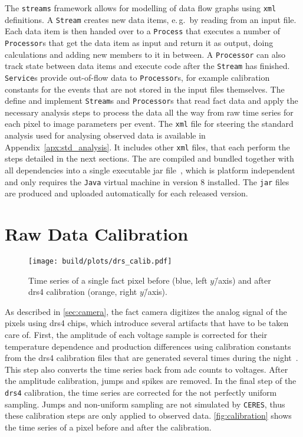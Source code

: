 The \texttt{streams} framework allows for modelling of data flow graphs using \texttt{xml}
definitions.
A \texttt{Stream} creates new data items, e.\,g.\ by reading from an input file.
Each data item is then handed over to a \texttt{Process} that executes a number of
\texttt{Processor}s that get the data item as input and return it as output, doing
calculations and adding new members to it in between.
A \texttt{Processor} can also track state between data items and execute code
after the \texttt{Stream} has finished.
\texttt{Service}s provide out-of-flow data to \texttt{Processor}s, for example
calibration constants for the events that are not stored in the input files themselves.
The \facttools{} define and implement \texttt{Stream}s and \texttt{Processor}s that read \gls{fact} data
and apply the necessary analysis steps to process the data all the way from 
raw time series for each pixel to image parameters per event.
The \texttt{xml} file for steering the \facttools{} standard analysis used for
analysing observed data is available in Appendix~\ref{apx:std_analysis}.
It includes other \texttt{xml} files, that each perform the steps detailed in the next 
sections.
The \facttools{} are compiled and bundled together with all dependencies
into a single executable jar file~\cite{jar}, which is platform independent and only
requires the \texttt{Java} virtual machine in version 8 installed.
The \texttt{jar} files are produced and uploaded automatically for each released version.


\section{Raw Data Calibration}\label{sec:calibration}
\begin{figure}
  \centering
  \texttt{[image: build/plots/drs\_calib.pdf]}
  \caption{%
    Time series of a single \gls{fact} pixel before (blue, left $y$\=/axis) and after \gls{drs4} calibration (orange, right $y$\=/axis).
  }\label{fig:calibration}
\end{figure}
\noindent As described in \autoref{sec:camera}, the \gls{fact} camera digitizes the 
analog signal of the pixels using \gls{drs4} chips, which introduce
several artifacts that have to be taken care of.
First, the amplitude of each voltage sample is corrected for their temperature
dependence and production differences using calibration constants
from the \gls{drs4} calibration files that are generated several times during the
night~\cite{fact-sipm-performance}.
This step also converts the time series back from \gls{adc} counts to voltages.
After the amplitude calibration, jumps and spikes are removed.
In the final step of the \texttt{drs4} calibration, the time series are corrected
for the not perfectly uniform sampling.
Jumps and non-uniform sampling are not simulated by \texttt{CERES}, thus these
calibration steps are only applied to observed data.
\autoref{fig:calibration} shows the time series of a pixel before and after
the calibration.

